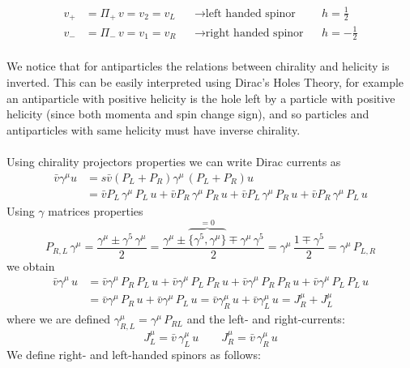 \documentclass[TheoreticalPhy_ModB.tex]{subfiles}
\begin{document}
\begin{align*}
v_+ 	& = \Pi_+ \, v = v_2 = v_L 	& &\to \text{left handed spinor}		& & h = \frac{1}{2} \\
v_- 	& = \Pi_- \, v = v_1 = v_R	& &\to \text{right handed spinor}		& & h = -\frac{1}{2} \\
\end{align*}

\begin{center}

\end{center}

We notice that for antiparticles the relations between chirality and helicity is inverted. This can be easily interpreted using Dirac's Holes Theory, for example an antiparticle with positive helicity is the hole left by a particle with positive helicity (since both momenta and spin change sign), and so particles and antiparticles with same helicity must have inverse chirality.\\ \\
Using chirality projectors properties we can write Dirac currents as
\[
\begin{split}
\bar{v}\gamma^{\mu}u 	& =s \bar{v}(P_L + P_R) \gamma^{\mu} \, (P_L +P_R) u \\
					& = \bar{v} P_L \, \gamma^{\mu} \, P_L \, u + \bar{v} P_R \, \gamma^{\mu} \, P_R \, u
					+ \bar{v} P_L \, \gamma^{\mu} \, P_R \, u + \bar{v} P_R \, \gamma^{\mu} \, P_L \, u
\end{split}
\]
Using $\gamma$ matrices properties
\[
P_{R,L} \, \gamma^{\mu} 
	= \frac{\gamma^{\mu} \pm \gamma^5 \, \gamma^{\mu}}{2} 
	= \frac{ \gamma^{\mu} \pm \overbrace{\{ \gamma^5, \gamma^{\mu} \}}^{=0} \mp \gamma^{\mu} \, \gamma^5}{2}
	= \gamma^{\mu} \, \frac{1 \mp \gamma^5}{2} = \gamma^{\mu} \, P_{L, R}
\]
we obtain
\[
\begin{split}
\bar{v}\gamma^{\mu} \, u 
	& = \bar{v} \gamma^{\mu} \, P_R \, P_L \, u + \bar{v} \gamma^{\mu} \, P_L \, P_R \, u
	+ \bar{v} \gamma^{\mu} \, P_R \, P_R \, u + \bar{v} \gamma^{\mu} \, P_L \, P_L \, u \\
	& = \bar{v} \gamma^{\mu} \, P_R \, u + \bar{v} \gamma^{\mu} \, P_L \, u
	= \bar{v} \gamma^{\mu}_R \, u + \bar{v} \gamma^{\mu}_L \, u = J^{\mu}_R + J^{\mu}_L
\end{split}
\]
where we are defined $\gamma^{\mu}_{R, L} = \gamma^{\mu} \, P_{RL}$ and the left- and right-currents:
\[
J_L^{\mu} = \bar{v} \, \gamma^{\mu}_L \, u
\qquad
J_R^{\mu} = \bar{v} \, \gamma_R^{\mu} \, u
\]
We define right- and left-handed spinors as follows:
\end{document}
